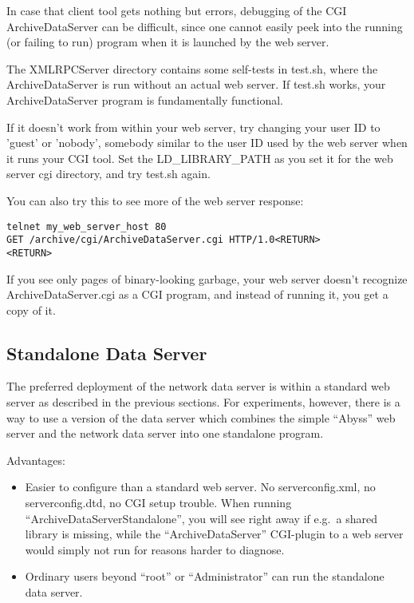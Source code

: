 In case that client tool gets nothing but errors, debugging of the
CGI ArchiveDataServer can be difficult, since one cannot easily
peek into the running (or failing to run) program when it is
launched by the web server.

The XMLRPCServer directory contains some self-tests in test.sh,
where the ArchiveDataServer is run without an actual web server.
If test.sh works, your ArchiveDataServer program is fundamentally
functional.

If it doesn't work from within your web server, try changing
your user ID to 'guest' or 'nobody', somebody similar to the user ID
used by the web server when it runs your CGI tool. Set the
LD\_LIBRARY\_PATH as you set it for the web server cgi directory,
and try test.sh again.

\noindent You can also try this to see more of the web server response:

\begin{lstlisting}[keywordstyle=\sffamily]
telnet my_web_server_host 80
GET /archive/cgi/ArchiveDataServer.cgi HTTP/1.0<RETURN>
<RETURN>
\end{lstlisting}

\noindent If you see only pages of binary-looking garbage, your web server
doesn't recognize ArchiveDataServer.cgi as a CGI program,
and instead of running it, you get a copy of it.

\subsection{Standalone Data Server} %
The preferred deployment of the network data server is within a
standard web server as described in the previous sections.
For experiments, however, there is a way to use a version of the 
data server which combines the simple ``Abyss''
web server and the network data server into one standalone program.

\noindent Advantages:
\begin{itemize}
\item Easier to configure than a standard web server. No
  serverconfig.xml, no serverconfig.dtd, no CGI setup trouble. When running
  ``ArchiveDataServerStandalone'', you will see right away if e.g.\ a
  shared library is missing, while the ``ArchiveDataServer''
  CGI-plugin to a web server would simply not run for reasons harder
  to diagnose.
\item Ordinary users beyond ``root'' or ``Administrator''
  can run the standalone data server.
\end{itemize}

